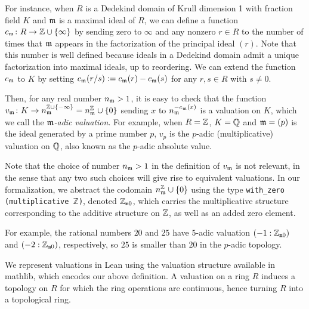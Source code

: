 \documentclass[sigplan,10pt,anonymous,review]{acmart}
\begin{document}
For instance, when $R$ is a Dedekind domain of Krull dimension 1 with fraction field $K$ and $\mathfrak{m}$ is a maximal ideal of $R$, we can define a function $c_{\mathfrak{m}} \colon R \to \mathbb{Z} \cup \{ \infty\}$  by sending zero to $\infty$ and any nonzero $r \in R$ to the number of times that $\mathfrak{m}$ appears in the factorization of the principal ideal $(r)$. Note that this number is well defined because ideals in a Dedekind domain admit a unique factorization into maximal ideals, up to reordering. We can extend the function $c_{\mathfrak{m}}$ to $K$ by setting $c_{\mathfrak{m}} (r/s) := c_{\mathfrak{m}} (r) - c_{\mathfrak{m}} (s)$ for any $r, s \in R$ with $s \ne 0$.

Then, for any real number $n_{\mathfrak{m}} > 1$, it is easy to check that the function
$ v_{\mathfrak{m}}\colon K \to n_{\mathfrak{m}}^{\mathbb{Z} \cup \{-\infty\}} = n_{\mathfrak{m}}^\mathbb{Z} \cup \{0\}$ sending $x$ to $n_{\mathfrak{m}}^{-c_{\mathfrak{m}}(x)}$ is a valuation on $K$, which we call the \textit{$\mathfrak{m}$-adic valuation}. For example, when $R = \mathbb{Z}$, $K = \mathbb{Q}$ and $\mathfrak{m} = (p)$ is the ideal generated by a prime number $p$, $v_p$ is the $p$-adic (multiplicative) valuation on $\mathbb{Q}$, also known as the $p$-adic absolute value.

Note that the choice of number $n_{\mathfrak{m}} > 1$ in the definition of $v_{\mathfrak{m}}$ is not relevant, in the sense that any two such choices will give rise to equivalent valuations. In our formalization, we abstract the codomain $n_{\mathfrak{m}}^\mathbb{Z} \cup \{0\}$ using the type
\texttt{with\_zero (multiplicative $\mathbb{Z}$)}, denoted $\mathbb{Z}_{\mathtt{m}0}$,
which carries the multiplicative structure corresponding to the additive structure on $\mathbb{Z}$, as well as an added zero element.

For example, the rational numbers $20$ and $25$ have $5$-adic valuation $(-1 : \mathbb{Z}_{\mathtt{m}0})$ and $(-2 : \mathbb{Z}_{\mathtt{m}0})$, respectively, so $25$ is smaller than $20$ in the $p$-adic topology. 

We represent valuations in Lean using the valuation structure \href{https://leanprover-community.github.io/mathlib_docs/ring_theory/valuation/basic.html#valuation}{\extlink}
 available in mathlib, which encodes our above definition. A valuation on a ring $R$ induces a topology on $R$ for which the ring operations are continuous, hence turning $R$ into a topological ring.
\end{document}
